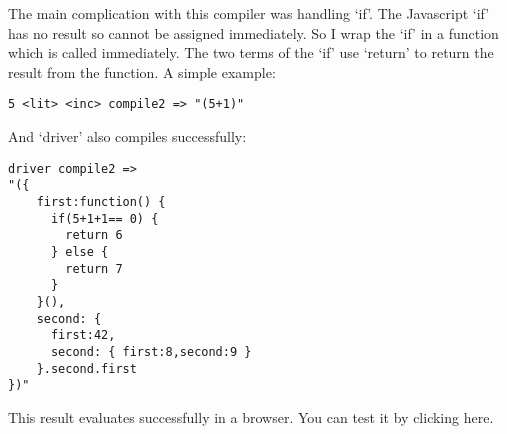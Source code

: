 The main complication with this compiler was handling `if'. The
Javascript `if' has no result so cannot be assigned immediately. So I
wrap the `if' in a function which is called immediately. The two terms
of the `if' use `return' to return the result from the function. A
simple example:

\begin{verbatim}
5 <lit> <inc> compile2 => "(5+1)"
\end{verbatim}

And `driver' also compiles successfully:

\begin{verbatim}
driver compile2 => 
"({ 
    first:function() {
      if(5+1+1== 0) {
        return 6
      } else { 
        return 7
      }
    }(),
    second: { 
      first:42,
      second: { first:8,second:9 } 
    }.second.first 
})"
\end{verbatim}

This result evaluates successfully in a browser. You can test it by clicking here.
